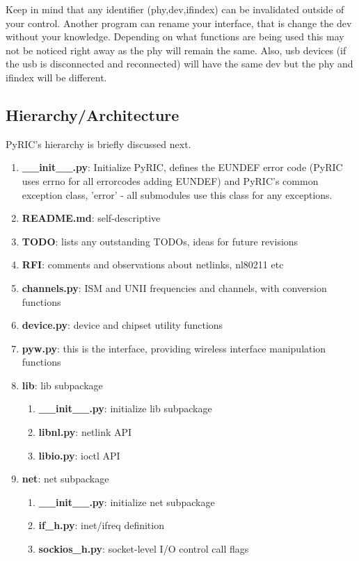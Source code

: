 \documentclass[11pt]{article}
\begin{document}
Keep in mind that any identifier (phy,dev,ifindex) can be invalidated outside of 
your control. Another program can rename your interface, that is change the dev 
without your knowledge. Depending on what functions are being used this may not 
be noticed right away as the phy will remain the same. Also, usb devices (if the 
usb is disconnected and reconnected) will have the same dev but the phy and 
ifindex will be different.

\subsection{Hierarchy/Architecture}
PyRIC's hierarchy is briefly discussed next.

\begin{enumerate}
\item \textbf{\_\_init\_\_.py}: Initialize PyRIC, defines the EUNDEF error code 
(PyRIC uses errno for all errorcodes adding EUNDEF) and PyRIC's common exception 
class, 'error' - all submodules use this class for any exceptions.  
\item \textbf{README.md}: self-descriptive
\item \textbf{TODO}: lists any outstanding TODOs, ideas for future revisions
\item \textbf{RFI}: comments and observations about netlinks, nl80211 etc
\item \textbf{channels.py}: ISM and UNII frequencies and channels, with conversion functions
\item \textbf{device.py}: device and chipset utility functions
\item \textbf{pyw.py}: this is the interface, providing wireless interface manipulation functions
\item \textbf{lib}: lib subpackage
\begin{enumerate}
\item \textbf{\_\_init\_\_.py}: initialize lib subpackage
\item \textbf{libnl.py}: netlink API
\item \textbf{libio.py}: ioctl API
\end{enumerate}
\item \textbf{net}: net subpackage
\begin{enumerate}
\item \textbf{\_\_init\_\_.py}: initialize net subpackage
\item \textbf{if\_h.py}: inet/ifreq definition
\item \textbf{sockios\_h.py}: socket-level I/O control call flags

\end{enumerate}
\end{enumerate}
\end{document}
